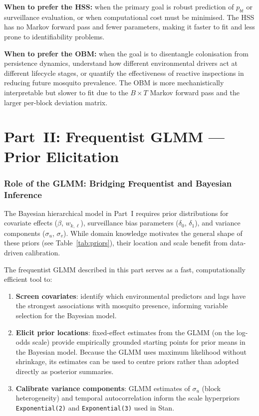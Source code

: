 \documentclass[12pt,a4paper]{article}
\begin{document}
\noindent\textbf{When to prefer the HSS:} when the primary goal is robust prediction of $p_{bt}$ or surveillance evaluation, or when computational cost must be minimised. The HSS has no Markov forward pass and fewer parameters, making it faster to fit and less prone to identifiability problems.

\noindent\textbf{When to prefer the OBM:} when the goal is to disentangle colonisation from persistence dynamics, understand how different environmental drivers act at different lifecycle stages, or quantify the effectiveness of reactive inspections in reducing future mosquito prevalence. The OBM is more mechanistically interpretable but slower to fit due to the $B \times T$ Markov forward pass and the larger per-block deviation matrix.



\part*{Part~II: Frequentist GLMM --- Prior Elicitation}

\section{Role of the GLMM: Bridging Frequentist and Bayesian Inference}

The Bayesian hierarchical model in Part~I requires prior distributions for covariate effects ($\beta$, $w_{k,\ell}$), surveillance bias parameters ($\delta_0$, $\delta_1$), and variance components ($\sigma_u$, $\sigma_v$). While domain knowledge motivates the general shape of these priors (see Table~\ref{tab:priors}), their location and scale benefit from data-driven calibration.

The frequentist GLMM described in this part serves as a fast, computationally efficient tool to:
\begin{enumerate}
\item \textbf{Screen covariates}: identify which environmental predictors and lags have the strongest associations with mosquito presence, informing variable selection for the Bayesian model.
\item \textbf{Elicit prior locations}: fixed-effect estimates from the GLMM (on the log-odds scale) provide empirically grounded starting points for prior means in the Bayesian model. Because the GLMM uses maximum likelihood without shrinkage, its estimates can be used to centre priors rather than adopted directly as posterior summaries.
\item \textbf{Calibrate variance components}: GLMM estimates of $\sigma_u$ (block heterogeneity) and temporal autocorrelation inform the scale hyperpriors \texttt{Exponential(2)} and \texttt{Exponential(3)} used in Stan.
\end{enumerate}
\end{document}
